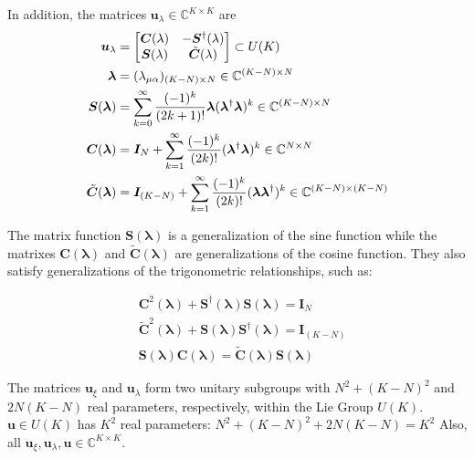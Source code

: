 \documentclass{aux/ttuthes2007}
\newcommand{\paren}[1]{\left( #1 \right)}
\newcommand{\elec}{N}
\newcommand{\orb}{K}
\newcommand{\uo}[1]{
		\IfEqCase{#1}{
			{0}{\mu}
			{1}{\nu}
			{2}{\xi}
		}[\PackageError{uo}{Undefined option to uo: #1}{}]
}
\newcommand{\oo}[1]{
		\IfEqCase{#1}{
			{0}{\alpha}
			{1}{\beta}
			{2}{\gamma}
		}[\PackageError{unocorb}{Undefined option to unuo: #1}{}]
}
\begin{document}
In addition, the matrices $\bm u_\lambda \in \mathbb{C}^{\orb \times \orb}$ are
\begin{equation*}
\begin{split}
	\bm u_\lambda &= \begin{bmatrix}\bm C(\lambda) & -\bm S^\dagger(\lambda) \\ \bm S(\lambda) & \tilde {\bm C}(\lambda)\end{bmatrix} \subset U(\orb) \\
	\bm \lambda &= (\lambda_{\uo 0 \oo 0})_{(\orb - \elec)\times \elec} \in \mathbb{C}^{\paren{\orb - \elec} \times \elec} \\
	\bm S(\bm \lambda) &= \sum_{k=0}^\infty \frac{(-1)^k}{(2k + 1)!}\bm \lambda(\bm \lambda^\dagger\bm \lambda)^k \in \mathbb{C}^{\paren{\orb - \elec} \times \elec}\\
	\bm C(\bm \lambda) &= \bm I_\elec + \sum_{k=1}^\infty \frac{(-1)^k}{(2k)!}(\bm \lambda^\dagger\bm \lambda)^k \in \mathbb{C}^{\elec \times \elec}\\
	\tilde {\bm C}(\bm \lambda) &= \bm I_{(\orb - \elec)} + \sum_{k=1}^\infty \frac{(-1)^k}{(2k)!}(\bm \lambda\bm \lambda^\dagger)^k \in \mathbb{C}^{\paren{\orb - \elec} \times \paren{\orb - \elec}}
\end{split}
\end{equation*}

The matrix function $\bm S(\bm \lambda)$ is a generalization of the sine function while the matrixes $\bm C(\bm \lambda)$ and $\tilde {\bm C}(\bm \lambda)$ are generalizations of the cosine function. They also satisfy generalizations of the trigonometric relationships, such as:

\begin{equation*}
\begin{split}
	&\bm C^2(\bm \lambda) + \bm S^\dagger(\bm \lambda)\bm S(\bm \lambda) = \bm I_{\elec} \\
	&\tilde{\bm C}^2(\bm \lambda) + \bm S(\bm \lambda)\bm S^\dagger(\bm \lambda) = \bm I_{\paren{\orb - \elec}} \\
	&\bm S(\bm \lambda)\bm C(\bm \lambda) = \tilde{\bm C}(\bm \lambda)\bm S(\bm \lambda)
\end{split}
\end{equation*}

The matrices $\bm u_\xi$ and $\bm u_\lambda$ form two unitary subgroups with 
$\elec^2 + \paren{\orb - \elec}^2$ 
and 
$2\elec\paren{\orb - \elec}$
real parameters, respectively, within the Lie Group 
$U(\orb)$. $\bm u \in U(\orb)$ has $\orb^2$ real parameters:
$\elec^2 + \paren{\orb - \elec}^2 + 2\elec\paren{\orb - \elec} = \orb^2$
Also, all 
$\bm u_\xi, \bm u_\lambda, \bm u \in \mathbb{C}^{\orb\times\orb}$.
\end{document}
